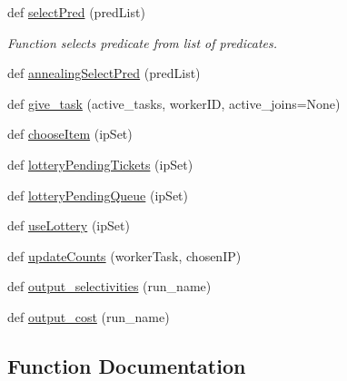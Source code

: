 \begin{DoxyCompactItemize}
def \mbox{\hyperlink{namespacedynamicfilterapp_1_1views__helpers_a76037300b9b8c326be6d116519d5a8b9}{select\+Pred}} (pred\+List)
\begin{DoxyCompactList}\small\item\em Function selects predicate from list of predicates. \end{DoxyCompactList}\item 
def \mbox{\hyperlink{namespacedynamicfilterapp_1_1views__helpers_a20d80f9f863820e348c0246b76e047c8}{annealing\+Select\+Pred}} (pred\+List)
\item 
def \mbox{\hyperlink{namespacedynamicfilterapp_1_1views__helpers_ae1724f8890647a7c5abb659a94496be3}{give\+\_\+task}} (active\+\_\+tasks, worker\+ID, active\+\_\+joins=None)
\item 
def \mbox{\hyperlink{namespacedynamicfilterapp_1_1views__helpers_ad1a6f030776f2f8bcaae48a4dda40665}{choose\+Item}} (ip\+Set)
\item 
def \mbox{\hyperlink{namespacedynamicfilterapp_1_1views__helpers_a0738b44c5100686a1e192f6a479f4079}{lottery\+Pending\+Tickets}} (ip\+Set)
\item 
def \mbox{\hyperlink{namespacedynamicfilterapp_1_1views__helpers_a426ae35faab4f6770841e95e8bdce591}{lottery\+Pending\+Queue}} (ip\+Set)
\item 
def \mbox{\hyperlink{namespacedynamicfilterapp_1_1views__helpers_ac70553a13de6691cab15abdda021c913}{use\+Lottery}} (ip\+Set)
\item 
def \mbox{\hyperlink{namespacedynamicfilterapp_1_1views__helpers_a57d6ebd6f2f99cba59b82eded490891f}{update\+Counts}} (worker\+Task, chosen\+IP)
\item 
def \mbox{\hyperlink{namespacedynamicfilterapp_1_1views__helpers_a28b75553c43cd75d039443c9fc2b6408}{output\+\_\+selectivities}} (run\+\_\+name)
\item 
def \mbox{\hyperlink{namespacedynamicfilterapp_1_1views__helpers_adc56ec55dcde832ccd85dfade3328264}{output\+\_\+cost}} (run\+\_\+name)
\end{DoxyCompactItemize}


\subsection{Function Documentation}
\mbox{\label{namespacedynamicfilterapp_1_1views__helpers_ac0d019064d0a4dff3cd08f7ea4c4d560}} 
